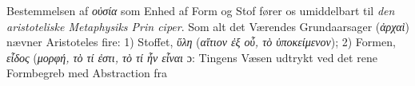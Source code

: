 \documentclass[12pt,a4paper]{book}
\newcommand{\gk}[1]{\textit{#1}}
\begin{document}
Bestemmelsen af \gk{οὐσία} som Enhed af Form og Stof fører
os umiddelbart til \emph{den aristoteliske Metaphysiks Prin\-%
\setcounter{footnote}{0}%
ciper}. Som alt det Værendes Grundaarsager (\gk{ἀρχαὶ}) nævner
Aristoteles fire: 1) Stoffet, \emph{\gk{ὕλη}} (\gk{αἴτιον ἐξ οὗ, τὸ ὑποκείμενον});
2) Formen, \emph{\gk{εἶδος}} (\gk{μορφή, τὸ τί ἐστι, τὸ τί ἦν εἶναι} ɔ: Tingens
Væsen udtrykt ved det rene Formbegreb med Abstraction fra
\end{document}
